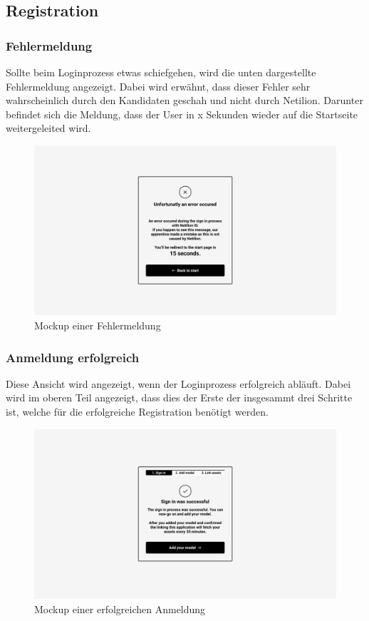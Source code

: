 \subsection{Registration} \label{mck:registration}
\subsubsection{Fehlermeldung}
Sollte beim Loginprozess etwas schiefgehen, wird die unten dargestellte Fehlermeldung angezeigt. Dabei wird erwähnt, dass dieser Fehler sehr wahrscheinlich durch den Kandidaten geschah und nicht durch Netilion. Darunter befindet sich die Meldung, dass der User in x Sekunden wieder auf die Startseite weitergeleited wird.
\begin{figure}[H]
  \centering
  \includegraphics[width=1\textwidth]{./mockups/register/error.pdf}
  \caption[{Mockup einer Fehlermeldung}]{Mockup einer Fehlermeldung}
  \label{fig:mck-error}
\end{figure}
\pagebreak
\subsubsection{Anmeldung erfolgreich}
Diese Ansicht wird angezeigt, wenn der Loginprozess erfolgreich abläuft. Dabei wird im oberen Teil angezeigt, dass dies der Erste der insgesammt drei Schritte ist, welche für die erfolgreiche Registration benötigt werden.
\begin{figure}[H]
  \centering
  \includegraphics[width=1\textwidth]{./mockups/register/stage_1.pdf}
  \caption[{Mockup einer erfolgreichen Anmeldung}]{Mockup einer erfolgreichen Anmeldung}
  \label{fig:mck-stage_1}
\end{figure}
\pagebreak
